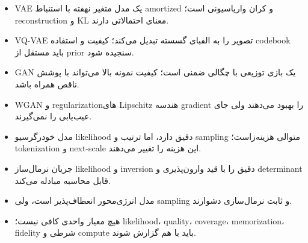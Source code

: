 \documentclass[12pt,openany,oneside]{book}
\begin{document}
\begin{summarybox}
\begin{itemize}
\item VAE یک مدل متغیر نهفته با استنباط amortized و کران واریاسیونی است؛ reconstruction و KL معنای احتمالاتی دارند.
\item VQ-VAE تصویر را به الفبای گسسته تبدیل می‌کند؛ کیفیت و استفاده codebook باید مستقل از prior سنجیده شود.
\item GAN یک بازی توزیعی با چگالی ضمنی است؛ کیفیت نمونه بالا می‌تواند با پوشش ناقص همراه باشد.
\item WGAN و regularizationهای Lipschitz هندسه gradient را بهبود می‌دهند ولی جای عیب‌یابی را نمی‌گیرند.
\item مدل خودرگرسیو likelihood دقیق دارد، اما ترتیب و sampling متوالی هزینه‌زاست؛ tokenization و next-scale این هزینه را تغییر می‌دهند.
\item جریان نرمال‌ساز likelihood و inversion دقیق را با قید وارون‌پذیری و determinant قابل محاسبه مبادله می‌کند.
\item مدل انرژی‌محور انعطاف‌پذیر است، ولی sampling و ثابت نرمال‌سازی دشوارند.
\item هیچ معیار واحدی کافی نیست؛ likelihood، quality، coverage، memorization، fidelity شرطی و compute باید با هم گزارش شوند.
\end{itemize}
\end{summarybox}
\end{document}
